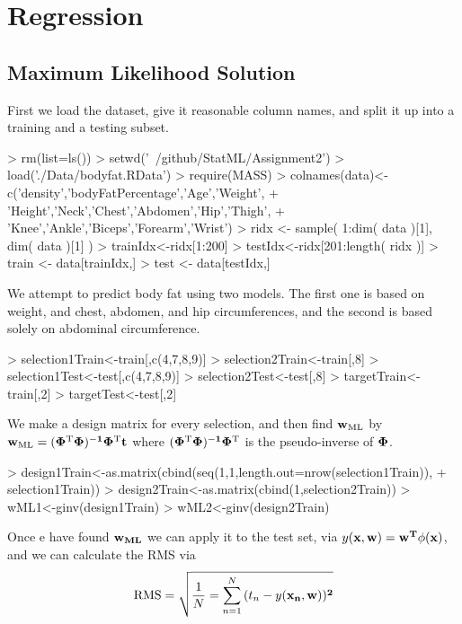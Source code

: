 \documentclass[nogin, 10pt]{article}
\begin{document}
\section{Regression}
\subsection{Maximum Likelihood Solution}
First we load the dataset, give it reasonable column names, and split it up into a training and a testing subset.
\begin{Schunk}
\begin{Sinput}
> rm(list=ls())
> setwd('~/github/StatML/Assignment2')
> load('./Data/bodyfat.RData')
> require(MASS)
> colnames(data)<-c('density','bodyFatPercentage','Age','Weight',
+                   'Height','Neck','Chest','Abdomen','Hip','Thigh',
+                   'Knee','Ankle','Biceps','Forearm','Wrist')
> ridx <- sample( 1:dim( data )[1], dim( data )[1] )
> trainIdx<-ridx[1:200]
> testIdx<-ridx[201:length( ridx )]
> train <- data[trainIdx,]
> test <- data[testIdx,]
\end{Sinput}
\end{Schunk}
We attempt to predict body fat using two models. The first one is based on weight, and chest, abdomen, and hip circumferences, and the second is based solely on abdominal circumference.
\begin{Schunk}
\begin{Sinput}
> selection1Train<-train[,c(4,7,8,9)]
> selection2Train<-train[,8]
> selection1Test<-test[,c(4,7,8,9)]
> selection2Test<-test[,8]
> targetTrain<-train[,2]
> targetTest<-test[,2]
\end{Sinput}
\end{Schunk}
We make a design matrix for every selection, and then find $\bf{w}_{\text{ML}}$ by $\bf{w}_{\text{ML}}=(\bf{\Phi}^{\text{T}}\bf{\Phi})^{-1}\bf{\Phi}^{\text{T}}\bf{t}$ where $(\bf{\Phi}^{\text{T}}\bf{\Phi})^{-1}\bf{\Phi}^{\text{T}}$ is the pseudo-inverse of $\bf{\Phi}$.
\begin{Schunk}
\begin{Sinput}
> design1Train<-as.matrix(cbind(seq(1,1,length.out=nrow(selection1Train)),
+                          selection1Train))
> design2Train<-as.matrix(cbind(1,selection2Train))
> wML1<-ginv(design1Train)%
> wML2<-ginv(design2Train)%
\end{Sinput}
\end{Schunk}
Once e have found $\bf{w}_{ML}$ we can apply it to the test set, via $y(\bf{x},\bf{w})=\bf{w}^{\bf{T}}\phi(\bf{x})$, and we can calculate the RMS via \[
\text{RMS}=\sqrt{\frac{1}{N}=\sum^N_{n=1}{(t_n-y(\bf{x}_n,\bf{w}))^2}}
\]
\end{document}
